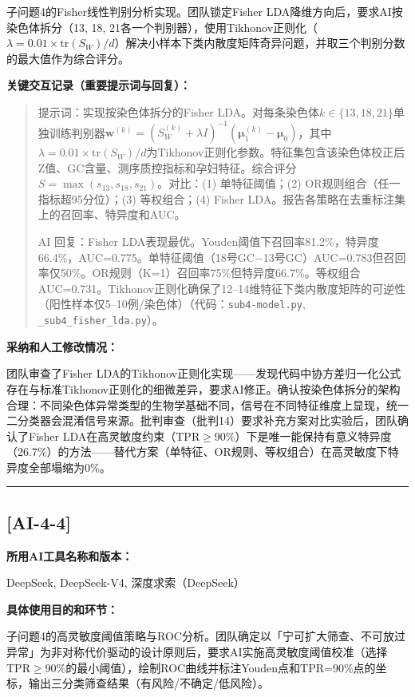 \documentclass[12pt,a4paper]{ctexart}
\begin{document}
子问题4的Fisher线性判别分析实现。团队锁定Fisher LDA降维方向后，要求AI按染色体拆分（13, 18, 21各一个判别器），使用Tikhonov正则化（$\lambda=0.01\times\text{tr}(S_W)/d$）解决小样本下类内散度矩阵奇异问题，并取三个判别分数的最大值作为综合评分。

\textbf{关键交互记录（重要提示词与回复）：}

\begin{quote}
提示词：实现按染色体拆分的Fisher LDA。对每条染色体$k\in\{13,18,21\}$单独训练判别器$\mathbf{w}^{(k)}=(S_W^{(k)}+\lambda I)^{-1}(\boldsymbol{\mu}_1^{(k)}-\boldsymbol{\mu}_0)$，其中$\lambda=0.01\times\text{tr}(S_W)/d$为Tikhonov正则化参数。特征集包含该染色体校正后Z值、GC含量、测序质控指标和孕妇特征。综合评分$S=\max(s_{13},s_{18},s_{21})$。对比：(1) 单特征阈值；(2) OR规则组合（任一指标超95分位）；(3) 等权组合；(4) Fisher LDA。报告各策略在去重标注集上的召回率、特异度和AUC。

AI 回复：Fisher LDA表现最优。Youden阈值下召回率81.2\%，特异度66.4\%，AUC=0.775。单特征阈值（18号GC$-$13号GC）AUC=0.783但召回率仅50\%。OR规则（K=1）召回率75\%但特异度66.7\%。等权组合AUC=0.731。Tikhonov正则化确保了12--14维特征下类内散度矩阵的可逆性（阳性样本仅5--10例/染色体）（代码：\texttt{sub4-model.py}, \texttt{\_sub4\_fisher\_lda.py}）。
\end{quote}

\textbf{采纳和人工修改情况：}

团队审查了Fisher LDA的Tikhonov正则化实现——发现代码中协方差归一化公式存在与标准Tikhonov正则化的细微差异，要求AI修正。确认按染色体拆分的架构合理：不同染色体异常类型的生物学基础不同，信号在不同特征维度上显现，统一二分类器会混淆信号来源。批判审查（批判14）要求补充方案对比实验后，团队确认了Fisher LDA在高灵敏度约束（TPR$\geq$90\%）下是唯一能保持有意义特异度（26.7\%）的方法——替代方案（单特征、OR规则、等权组合）在高灵敏度下特异度全部塌缩为0\%。

\vspace{1em}
\hrule
\vspace{1em}

\subsection*{[AI-4-4]}

\textbf{所用AI工具名称和版本：}

DeepSeek, DeepSeek-V4, 深度求索（DeepSeek）

\textbf{具体使用目的和环节：}

子问题4的高灵敏度阈值策略与ROC分析。团队确定以「宁可扩大筛查、不可放过异常」为非对称代价驱动的设计原则后，要求AI实施高灵敏度阈值校准（选择TPR$\geq$90\%的最小阈值），绘制ROC曲线并标注Youden点和TPR=90\%点的坐标，输出三分类筛查结果（有风险/不确定/低风险）。
\end{document}
